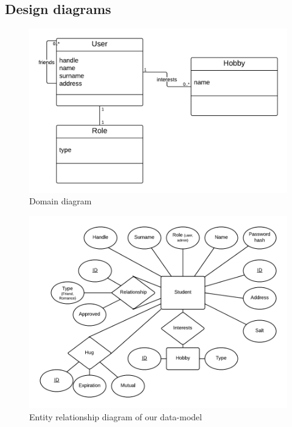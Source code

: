 \documentclass[a4paper]{article}
\begin{document}
\subsection{Design diagrams}
\begin{figure}[h!]
\centering
\includegraphics[scale=0.3]{Domain}
\caption{Domain diagram}
\label{fig:domain_diagram}
\end{figure}
\begin{figure}[h!]
\centering
\includegraphics[scale=0.4]{ER}
\caption{Entity relationship diagram of our data-model}
\label{fig:er_diagram}
\end{figure}
\end{document}
